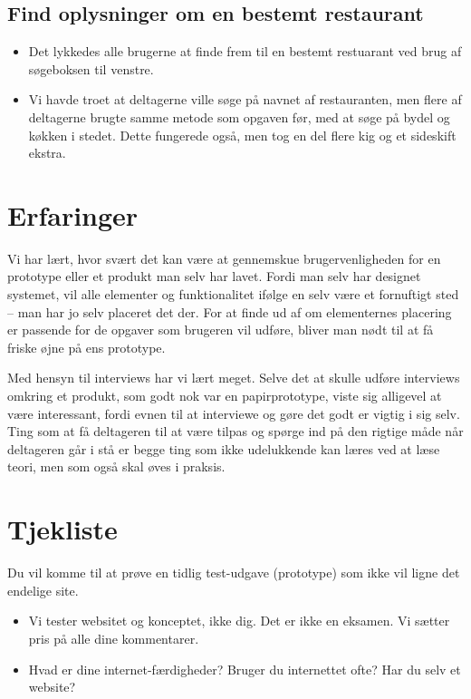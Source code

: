 \documentclass[a4paper, 12pt]{article}
\newcommand\pic[1]{\texttt{[image: ../oevelse6/Pics/\#1]}}
\newcommand\good{\pic{good}}
\newcommand\smallprob{\pic{smallproblem}}
\begin{document}
\subsection{Find oplysninger om en bestemt restaurant}
\begin{itemize}
\item[\good] Det lykkedes alle brugerne at finde frem til en bestemt restuarant ved brug af søgeboksen til venstre.
\item[\smallprob] Vi havde troet at deltagerne ville søge på navnet af restauranten, men flere af deltagerne brugte samme metode som opgaven før, med at søge på bydel og køkken i stedet. Dette fungerede også, men tog en del flere kig og et sideskift ekstra.
\end{itemize}


\section{Erfaringer}
\label{sec:Erfaringer}

Vi har lært, hvor svært det kan være at gennemskue brugervenligheden for en prototype eller et produkt man selv har lavet. Fordi man selv har designet systemet, vil alle elementer og funktionalitet ifølge en selv være et fornuftigt sted -- man har jo selv placeret det der. For at finde ud af om elementernes placering er passende for de opgaver som brugeren vil udføre, bliver man nødt til at få friske øjne på ens prototype. 

Med hensyn til interviews har vi lært meget. Selve det at skulle udføre interviews omkring et produkt, som godt nok var en papirprototype, viste sig alligevel at være interessant, fordi evnen til at interviewe og gøre det godt er vigtig i sig selv. Ting som at få deltageren til at være tilpas og spørge ind på den rigtige måde når deltageren går i stå er begge ting som ikke udelukkende kan læres ved at læse teori, men som også skal øves i praksis.
\clearpage
\appendix

\section{Tjekliste}
\label{appx:tjekliste}

Du vil komme til at prøve en tidlig test-udgave (prototype) som ikke vil ligne
det endelige site.
\begin{itemize}
\item Vi tester websitet og konceptet, ikke dig. Det er ikke en
  eksamen. Vi sætter pris på alle dine kommentarer.
\item Hvad er dine internet-færdigheder? Bruger du internettet ofte?
  Har du selv et website?
\end{itemize}
\end{document}
